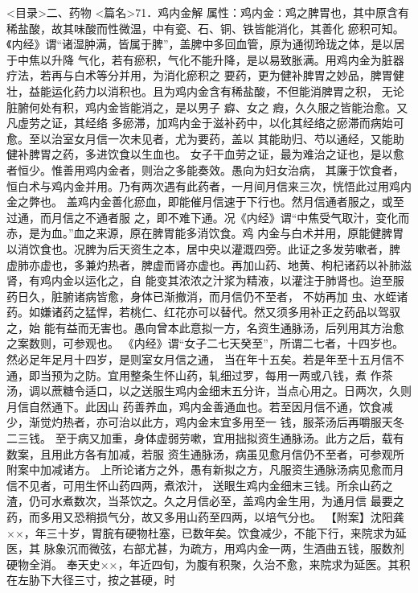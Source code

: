 \documentclass[a4paper,12pt,UTF8,twoside]{ctexbook}
\begin{document}
<目录>二、药物
<篇名>71．鸡内金解
属性：鸡内金∶鸡之脾胃也，其中原含有稀盐酸，故其味酸而性微温，中有瓷、石、铜、铁皆能消化，其善化 
瘀积可知。《内经》谓“诸湿肿满，皆属于脾”，盖脾中多回血管，原为通彻玲珑之体，是以居于中焦以升降 
气化，若有瘀积，气化不能升降，是以易致胀满。用鸡内金为脏器疗法，若再与白术等分并用，为消化瘀积之 
要药，更为健补脾胃之妙品，脾胃健壮，益能运化药力以消积也。且为鸡内金含有稀盐酸，不但能消脾胃之积， 
无论脏腑何处有积，鸡内金皆能消之，是以男子 癖、女之 瘕，久久服之皆能治愈。又凡虚劳之证，其经络 
多瘀滞，加鸡内金于滋补药中，以化其经络之瘀滞而病始可愈。至以治室女月信一次未见者，尤为要药，盖以 
其能助归、芍以通经，又能助健补脾胃之药，多进饮食以生血也。 
女子干血劳之证，最为难治之证也，是以愈者恒少。惟善用鸡内金者，则治之多能奏效。愚向为妇女治病， 
其廉于饮食者，恒白术与鸡内金并用。乃有两次遇有此药者，一月间月信来三次，恍悟此过用鸡内金之弊也。 
盖鸡内金善化瘀血，即能催月信速于下行也。然月信通者服之，或至过通，而月信之不通者服 
之，即不难下通。况《内经》谓“中焦受气取汁，变化而赤，是为血。”血之来源，原在脾胃能多消饮食。鸡 
内金与白术并用，原能健脾胃以消饮食也。况脾为后天资生之本，居中央以灌溉四旁。此证之多发劳嗽者，脾 
虚肺亦虚也，多兼灼热者，脾虚而肾亦虚也。再加山药、地黄、枸杞诸药以补肺滋肾，有鸡内金以运化之，自 
能变其浓浓之汁浆为精液，以灌注于肺肾也。迨至服药日久，脏腑诸病皆愈，身体已渐撤消，而月信仍不至者， 
不妨再加 虫、水蛭诸药。如嫌诸药之猛悍，若桃仁、红花亦可以替代。然又须多用补正之药品以驾驭之，始 
能有益而无害也。愚向曾本此意拟一方，名资生通脉汤，后列用其方治愈之案数则，可参观也。 
《内经》谓“女子二七天癸至”，所谓二七者，十四岁也。然必足年足月十四岁，是则室女月信之通， 
当在年十五矣。若是年至十五月信不通，即当预为之防。宜用整条生怀山药，轧细过罗，每用一两或八钱，煮 
作茶汤，调以蔗糖令适口，以之送服生鸡内金细末五分许，当点心用之。日两次，久则月信自然通下。此因山 
药善养血，鸡内金善通血也。若至因月信不通，饮食减少，渐觉灼热者，亦可治以此方，鸡内金末宜多用至一 
钱，服茶汤后再嚼服天冬二三钱。 
至于病又加重，身体虚弱劳嗽，宜用拙拟资生通脉汤。此方之后，载有数案，且用此方各有加减，若服 
资生通脉汤，病虽见愈月信仍不至者，可参观所附案中加减诸方。 
上所论诸方之外，愚有新拟之方，凡服资生通脉汤病见愈而月信不见者，可用生怀山药四两，煮浓汁， 
送眼生鸡内金细末三钱。所余山药之渣，仍可水煮数次，当茶饮之。久之月信必至，盖鸡内金生用，为通月信 
最要之药，而多用又恐稍损气分，故又多用山药至四两，以培气分也。 
【附案】沈阳龚××，年三十岁，胃脘有硬物杜塞，已数年矣。饮食减少，不能下行，来院求为延医，其 
脉象沉而微弦，右部尤甚，为疏方，用鸡内金一两，生酒曲五钱，服数剂硬物全消。 
奉天史××，年近四旬，为腹有积聚，久治不愈，来院求为延医。其积在左胁下大径三寸，按之甚硬，时 
\end{document}
